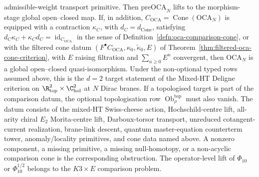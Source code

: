 \begin{thm}
admissible-weight transport primitive.  Then
		\(\mathrm{preOCA}_N\) lifts to the morphism-stage global
open--closed map.
If, in addition,
\(C_{\mathrm{OCA}}=\operatorname{Cone}(\mathrm{OCA}_N)\) is equipped with
a contraction \(\kappa_C\), with \(d_C=d_{\operatorname{Cone}}\), satisfying
\(d_C\kappa_C+\kappa_Cd_C=\operatorname{id}_{C_{\mathrm{OCA}}}\)
in the sense of Definition~\ref{defn:oca-comparison-cone}, or with the
filtered cone datum
\((F^\bullet C_{\mathrm{OCA}},\kappa_0,\widetilde\kappa_0,E)\) of
Theorem~\ref{thm:filtered-oca-cone-criterion}, with \(E\) raising
filtration and \(\sum_{n\ge0}E^n\) convergent, then \(\mathrm{OCA}_N\)
is a global open--closed quasi-isomorphism.  Under the non-optional
typed rows assumed above, this is the \(d=2\) target statement of the
Mixed-HT Deligne criterion on
	\(\R^2_{\mathrm{top}}\times\C^2_{\mathrm{hol}}\) at \(N\) Dirac branes.
	If a topologised target is part of the comparison datum, the optional
	topologisation row \(\operatorname{Ob}^{\mathrm{top}}_\rho\) must also
	vanish.
	The datum consists of the mixed-HT Swiss-cheese action,
	Hochschild-centre lift, all-arity chiral \(E_2\) Morita-centre lift,
	Darboux-torsor transport, unreduced cotangent-current realization,
	brane-link descent, quantum master-equation counterterm tower,
	anomaly/locality primitives, and cone data named above.  A nonzero
	component, a missing primitive, a missing null-homotopy, or a
	non-acyclic comparison cone is the corresponding obstruction.
	The operator-level lift of \(\Phi_{10}\) or
	\(\Phi_{10}^{1/2}\) belongs to the \(K3\times E\) comparison problem.
\end{thm}

